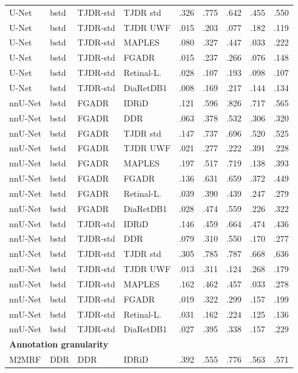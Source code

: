 \begin{landscape}
{\begin{longtable}{l l l l c c c c c}
U-Net & bstd & TJDR-std & TJDR std & .326 & .775 & .642 & .455 & .550 \\
U-Net & bstd & TJDR-std & TJDR UWF & .015 & .203 & .077 & .182 & .119 \\
U-Net & bstd & TJDR-std & MAPLES & .080 & .327 & .447 & .033 & .222 \\
U-Net & bstd & TJDR-std & FGADR & .015 & .237 & .266 & .076 & .148 \\
U-Net & bstd & TJDR-std & Retinal-L. & .028 & .107 & .193 & .098 & .107 \\
U-Net & bstd & TJDR-std & DiaRetDB1 & .008 & .169 & .217 & .144 & .134 \\
nnU-Net & bstd & FGADR & IDRiD & .121 & .596 & .826 & .717 & .565 \\
nnU-Net & bstd & FGADR & DDR & .063 & .378 & .532 & .306 & .320 \\
nnU-Net & bstd & FGADR & TJDR std & .147 & .737 & .696 & .520 & .525 \\
nnU-Net & bstd & FGADR & TJDR UWF & .021 & .277 & .222 & .391 & .228 \\
nnU-Net & bstd & FGADR & MAPLES & .197 & .517 & .719 & .138 & .393 \\
nnU-Net & bstd & FGADR & FGADR & .136 & .631 & .659 & .372 & .449 \\
nnU-Net & bstd & FGADR & Retinal-L. & .039 & .390 & .439 & .247 & .279 \\
nnU-Net & bstd & FGADR & DiaRetDB1 & .028 & .474 & .559 & .226 & .322 \\
nnU-Net & bstd & TJDR-std & IDRiD & .146 & .459 & .664 & .474 & .436 \\
nnU-Net & bstd & TJDR-std & DDR & .079 & .310 & .550 & .170 & .277 \\
nnU-Net & bstd & TJDR-std & TJDR std & .305 & .785 & .787 & .668 & .636 \\
nnU-Net & bstd & TJDR-std & TJDR UWF & .013 & .311 & .124 & .268 & .179 \\
nnU-Net & bstd & TJDR-std & MAPLES & .162 & .462 & .457 & .033 & .278 \\
nnU-Net & bstd & TJDR-std & FGADR & .019 & .322 & .299 & .157 & .199 \\
nnU-Net & bstd & TJDR-std & Retinal-L. & .031 & .162 & .224 & .125 & .136 \\
nnU-Net & bstd & TJDR-std & DiaRetDB1 & .027 & .395 & .338 & .157 & .229 \\
\multicolumn{9}{l}{\textbf{Annotation granularity}}\\
M2MRF & DDR & DDR & IDRiD & .392 & .555 & .776 & .563 & .571 \\

\end{longtable}}
\end{landscape}

